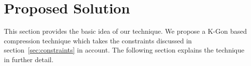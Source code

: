\documentclass[conference]{IEEEtran}
\begin{document}
%
%
\section{Proposed Solution}
\label{s:proposed-solution}
This section provides the basic idea of our technique. We propose a K-Gon based compression technique which 
takes the constraints discussed in section~\ref{sec:constraints} in account. The following section explains 
the technique in further detail.
%
\end{document}
